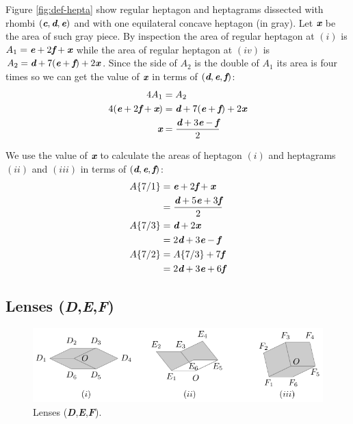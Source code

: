 \documentclass[11pt]{article}
\def\mathbi#1{\textbf{\em #1}}
\begin{document}
Figure \ref{fig:def-hepta} show regular heptagon and heptagrams dissected with rhombi $(\mathbi{c},\mathbi{d},\mathbi{e})$ and with one equilateral concave heptagon (in gray). Let $\mathbi{x}$ be the area of such gray piece. By inspection the area of regular heptagon at $(i)$ is $A_1 = \mathbi{e} + 2\mathbi{f} + \mathbi{x}$ while the area of regular heptagon at $(iv)$ is $A_2 = \mathbi{d} + 7(\mathbi{e}+\mathbi{f}) + 2\mathbi{x}$. Since the side of $A_2$ is the double of $A_1$ its area is four times so we can get the value of $\mathbi{x}$ in terms of $(\mathbi{d},\mathbi{e},\mathbi{f})$:
\begin{align}
4A_1 &= A_2 \nonumber\\
4(\mathbi{e} + 2\mathbi{f} + \mathbi{x}) &= \mathbi{d} + 7(\mathbi{e}+\mathbi{f}) + 2\mathbi{x} \nonumber\\
\mathbi{x} &= \frac{\mathbi{d} + 3\mathbi{e} - \mathbi{f}}2
\end{align}

We use the value of $\mathbi{x}$ to calculate the areas of heptagon $(i)$ and heptagrams $(ii)$ and $(iii)$ in terms of $(\mathbi{d},\mathbi{e},\mathbi{f})$:
\begin{align}
A\{7/1\} &= \mathbi{e} + 2\mathbi{f} + \mathbi{x} \nonumber\\
    &= \frac{\mathbi{d} + 5\mathbi{e} + 3\mathbi{f}}2 \\
A\{7/3\} &= \mathbi{d} + 2\mathbi{x} \nonumber\\
 &= 2\mathbi{d} + 3\mathbi{e} - \mathbi{f} \\
A\{7/2\} &= A\{7/3\} + 7\mathbi{f} \nonumber\\
 &= 2\mathbi{d} + 3\mathbi{e} + 6\mathbi{f}
\end{align}

\subsection{Lenses (\mathbi{D},\mathbi{E},\mathbi{F})}

\begin{figure}[H]
\centering
\includegraphics[scale=1.1]{def/def}
\caption{Lenses (\mathbi{D},\mathbi{E},\mathbi{F}).}
\label{fig:bc-hexagons}
\end{figure}
\end{document}
